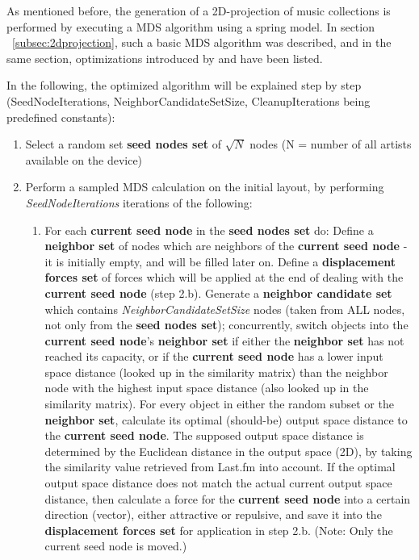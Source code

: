 As mentioned before, the generation of a 2D-projection of music collections is performed by executing a MDS algorithm using a spring model. In section ~\ref{subsec:2dprojection}, such a basic MDS algorithm was described, and in the same section, optimizations introduced by \cite{Chalmers:1996:LIT:244979.245035} and \cite{Morrison:2003:FMS} have been listed.

In the following, the optimized algorithm will be explained step by step (SeedNodeIterations, NeighborCandidateSetSize, CleanupIterations being predefined constants):

\begin{enumerate}
	\item Select a random set \textbf{seed nodes set} of $\sqrt{N}$ nodes (N = number of all artists available on the device)
	\item Perform a sampled MDS calculation on the initial layout, by performing \emph{SeedNodeIterations} iterations of the following:
		\begin{enumerate}
			\item For each \textbf{current seed node} in the \textbf{seed nodes set} do:
				\subitem Define a \textbf{neighbor set} of nodes which are neighbors of the \textbf{current seed node} - it is initially empty, and will be filled later on. Define a \textbf{displacement forces set} of forces which will be applied at the end of dealing with the \textbf{current seed node} (step 2.b).
				\subitem Generate a \textbf{neighbor candidate set} which contains \emph{NeighborCandidateSetSize} nodes (taken from ALL nodes, not only from the \textbf{seed nodes set}); concurrently, switch objects into the \textbf{current seed node}'s \textbf{neighbor set} if either the \textbf{neighbor set} has not reached its capacity, or if the \textbf{current seed node} has a lower input space distance (looked up in the similarity matrix) than the neighbor node with the highest input space distance (also looked up in the similarity matrix).
				\subitem For every object in either the random subset or the \textbf{neighbor set}, calculate its optimal (should-be) output space distance to the \textbf{current seed node}. The supposed output space distance is determined by the Euclidean distance in the output space (2D), by taking the similarity value retrieved from Last.fm into account.
				\subitem If the optimal output space distance does not match the actual current output space distance, then calculate a force for the \textbf{current seed node} into a certain direction (vector), either attractive or repulsive, and save it into the \textbf{displacement forces set} for application in step 2.b. (Note: Only the current seed node is moved.)

\end{enumerate}
\end{enumerate}
